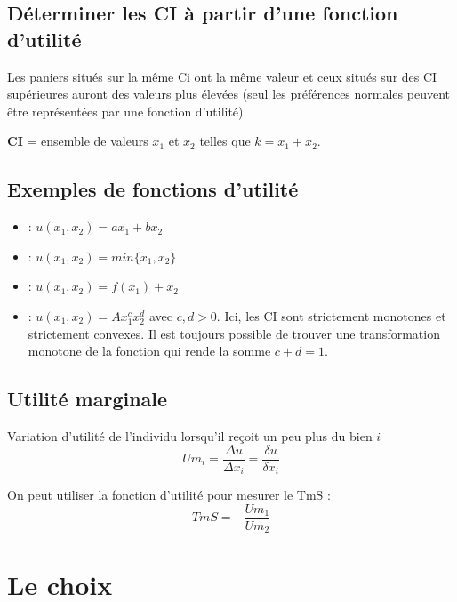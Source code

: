 \subsection{Déterminer les CI à partir d'une fonction d'utilité}

Les paniers situés sur la même Ci ont la même valeur et ceux situés sur des CI supérieures auront des valeurs plus élevées (seul les préférences normales peuvent être représentées par une fonction d'utilité).

\textbf{CI} = ensemble de valeurs $x_1$ et $x_2$ telles que $k = x_1 + x_2$.

\subsection{Exemples de fonctions d'utilité}

\begin{itemize}
\item {} : $u(x_1,x_2) = ax_1 + bx_2$
\item {} : $u(x_1,x_2) = min\{x_1,x_2\}$
\item {} : $u(x_1,x_2) = f(x_1) + x_2$
\item {} : $u(x_1,x_2) = Ax^c_1x^d_2$ avec $c,d > 0$.
Ici, les CI sont strictement monotones et strictement convexes. Il est toujours possible de trouver une transformation monotone de la fonction qui rende la somme $c+d=1$.
\end{itemize}

\subsection{Utilité marginale}

Variation d'utilité de l'individu lorsqu'il reçoit un peu plus du bien $i$
\begin{equation*}
Um_i = \frac{\Delta u}{\Delta x_i} = \frac{\delta u}{\delta x_i}
\end{equation*}

On peut utiliser la fonction d'utilité pour mesurer le TmS :
\begin{equation*}
TmS = -\frac{Um_1}{Um_2}
\end{equation*}

\section{Le choix}

